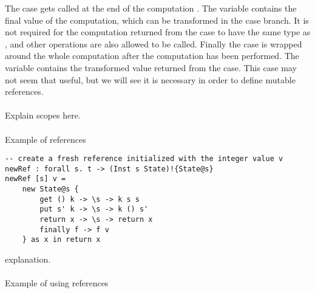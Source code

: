 The  case gets called at the end of the computation .
The variable  contains the final value of the computation, which can be transformed in the case branch.
It is not required for the computation returned from the case to have the same type as , and other operations are also allowed to be called.
Finally the  case is wrapped around the whole computation  after the  computation has been performed.
The variable  contains the transformed value returned from the  case.
This case may not seem that useful, but we will see it is necessary in order to define mutable references.
\\\\
Explain scopes here.
\\\\
Example of references

\begin{verbatim}
-- create a fresh reference initialized with the integer value v
newRef : forall s. t -> (Inst s State)!{State@s}
newRef [s] v =
	new State@s {
		get () k -> \s -> k s s
		put s' k -> \s -> k () s'
		return x -> \s -> return x
		finally f -> f v
	} as x in return x
\end{verbatim}
explanation.
\\\\
Example of using references

